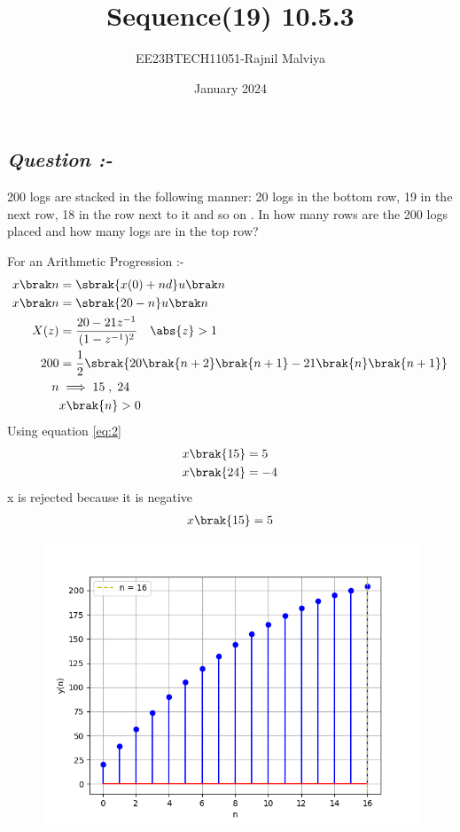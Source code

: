 \documentclass[journal,12pt,twocolumn]{IEEEtran}
\theoremstyle{remark}
\begin{document}
\title{Sequence(19) 10.5.3}
\author{EE23BTECH11051-Rajnil Malviya}
\date{January 2024}
\maketitle
\subsection*{\textit{Question :-}}
200 logs are stacked in the following manner: 20 logs in the bottom row, 19 in the next row,
18 in the row next to it and so on . In how many rows are the 200 logs placed
and how many logs are in the top row?

\begin{table}[h!]
   
        
       
    \end{table}
For an Arithmetic Progression :-
\begin{align}x\brak n&=\sbrak {x(0)+n d} u \brak n \label{eq:1}\\
x\brak n&=\sbrak{20-n} u \brak n \label{eq:2}\\
 X(z)&=\frac{20-21z^{-1}}{(1 - z^{-1})^2}  \quad \abs{ z} > 1 \label{eq:3}\\
  200 &=\frac{1}{2}\sbrak{20\brak{n+2}\brak{n+1}-21\brak{n}\brak{n+1}} \label{eq:4}\\
   n & \implies15\; ,\;24 \label{eq:5}\\
 & x\brak{n}>0 \label{eq:6}
 \end{align}
Using equation \eqref{eq:2}
\begin{align} &x\brak{15}=5 \label{eq:7}\\
 &x\brak{24}=-4 \label{eq:8} \end{align}
x is rejected because it is negative
\begin{align}x\brak{15}=5\end{align}
\newpage
\begin{figure}
   \includegraphics[width=1\linewidth]{figs/f2.png}
\end{figure}
\end{document}
